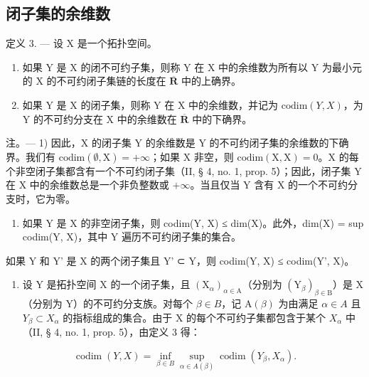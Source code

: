 \subsection{闭子集的余维数}

定义 3. --- 设 X 是一个拓扑空间。

\begin{enumerate}
\def\labelenumi{\alph{enumi})}
\item
  如果 Y 是 X 的闭不可约子集，则称 Y 在 X 中的余维数为所有以 Y 为最小元的 X 的不可约闭子集链的长度在 \(\overline{\mathbf{R}}\) 中的上确界。
\item
  如果 Y 是 X 的闭子集，则称 Y 在 X 中的余维数，并记为 \(\text{codim}(Y, X)\)，为 Y 的不可约分支在 X 中的余维数在 \(\overline{\mathbf{R}}\) 中的下确界。
\end{enumerate}

注。--- 1) 因此，X 的闭子集 Y 的余维数是 Y 的不可约闭子集的余维数的下确界。我们有 \(\mathrm{codim}(\emptyset, \mathrm{X}) = +\infty\)；如果 X 非空，则 \(\mathrm{codim}(\mathrm{X}, \mathrm{X}) = 0\)。X 的每个非空闭子集都含有一个不可约闭子集（II, § 4, no. 1, prop. 5）；因此，闭子集 Y 在 X 中的余维数总是一个非负整数或 \(+\infty\)。当且仅当 Y 含有 X 的一个不可约分支时，它为零。

\begin{enumerate}
\def\labelenumi{\arabic{enumi})}
\setcounter{enumi}{1}
\tightlist
\item
  如果 Y 是 X 的非空闭子集，则 codim(Y, X) ≤ dim(X)。此外，dim(X) = sup codim(Y, X)，其中 Y 遍历不可约闭子集的集合。
\end{enumerate}

如果 Y 和 Y' 是 X 的两个闭子集且 Y' ⊂ Y，则 codim(Y, X) ≤ codim(Y', X)。

\begin{enumerate}
\def\labelenumi{\arabic{enumi})}
\setcounter{enumi}{2}
\tightlist
\item
  设 Y 是拓扑空间 X 的一个闭子集，且 \((\mathrm{X}_{\alpha})_{\alpha\in\mathrm{A}}\)（分别为 \((\mathrm{Y}_{\beta})_{\beta\in\mathrm{B}}\)）是 X（分别为 Y）的不可约分支族。对每个 \(\beta\in B\)，记 \(\mathrm{A}(\beta)\) 为由满足 \(\alpha\in A\) 且 \(Y_{\beta}\subset X_{\alpha}\) 的指标组成的集合。由于 X 的每个不可约子集都包含于某个 \(X_{\alpha}\) 中（II, § 4, no. 1, prop. 5），由定义 3 得：
\end{enumerate}

\[
\operatorname{codim} (Y, X) = \inf _ {\beta \in B} \sup _ {\alpha \in A (\beta)} \operatorname{codim} (Y _ {\beta}, X _ {\alpha}).
\]

